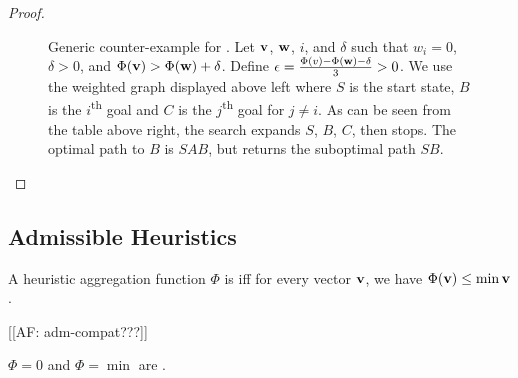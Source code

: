 \begin{proof}
\begin{figure}
{
  } \hfill
  \caption{Generic counter-example for \kastarphi.
    Let $\mathbf{v}$, $\mathbf{w}$, $i$, and $\delta$ such that $w_i = 0$, $\delta > 0$, and $\Phi(\mathbf{v}) > \Phi(\mathbf{w}) + \delta$.
    Define $\epsilon = \frac{\Phi(v) - \Phi(\mathbf{w}) - \delta}{3} > 0$.
    We use the weighted graph displayed above left where $S$ is the start state, $B$ is the $i$\textsuperscript{th} goal and $C$ is the $j$\textsuperscript{th} goal for $j \neq i$.
     As can be seen from the table above right, the search expands $S$, $B$, $C$, then stops.
     The optimal path to $B$ is $SAB$, but \kastarphi returns the suboptimal path $SB$.}
  \label{fig:kstarphi-bad}
\end{figure}
\end{proof}


\subsection{Admissible Heuristics}
\begin{definition}
  A heuristic aggregation function $\Phi$ is \emph{\axiomadm} iff for every vector $\mathbf{v}$, we have $\Phi(\mathbf{v}) \leq \min \mathbf{v}$.
\end{definition}
[[AF: adm-compat???]]
\begin{observation}
  $\Phi = 0$ and $\Phi=\min$ are \axiomadm.
\end{observation}

